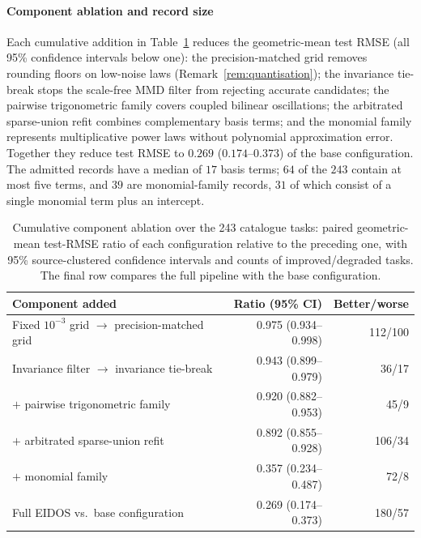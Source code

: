 \paragraph{Component ablation and record size} Each cumulative addition in Table~\ref{tab:ablation} reduces the geometric-mean test RMSE (all 95\% confidence intervals below one): the precision-matched grid removes rounding floors on low-noise laws (Remark~\ref{rem:quantisation}); the invariance tie-break stops the scale-free MMD filter from rejecting accurate candidates; the pairwise trigonometric family covers coupled bilinear oscillations; the arbitrated sparse-union refit combines complementary basis terms; and the monomial family represents multiplicative power laws without polynomial approximation error. Together they reduce test RMSE to \(0.269\) (\(0.174\)--\(0.373\)) of the base configuration. The admitted records have a median of \(17\) basis terms; \(64\) of the \(243\) contain at most five terms, and \(39\) are monomial-family records, \(31\) of which consist of a single monomial term plus an intercept.

\begin{table}[t]
\def\baselinestretch{1}\selectfont
\caption{Cumulative component ablation over the 243 catalogue tasks: paired geometric-mean test-RMSE ratio of each configuration relative to the preceding one, with 95\% source-clustered confidence intervals and counts of improved/degraded tasks. The final row compares the full pipeline with the base configuration.}\label{tab:ablation}
\centering
\scriptsize
\setlength{\tabcolsep}{3.0pt}
\begin{tabular}{@{}lrr@{}}
\toprule
\textbf{Component added} & \textbf{Ratio (95\% CI)} & \textbf{Better/worse} \\
\midrule
Fixed \(10^{-3}\) grid \(\to\) precision-matched grid & 0.975 (0.934--0.998) & 112/100 \\
Invariance filter \(\to\) invariance tie-break & 0.943 (0.899--0.979) & 36/17 \\
\(+\) pairwise trigonometric family & 0.920 (0.882--0.953) & 45/9 \\
\(+\) arbitrated sparse-union refit & 0.892 (0.855--0.928) & 106/34 \\
\(+\) monomial family & 0.357 (0.234--0.487) & 72/8 \\
\addlinespace[3pt]
Full EIDOS vs.\ base configuration & 0.269 (0.174--0.373) & 180/57 \\
\bottomrule
\end{tabular}
\end{table}


